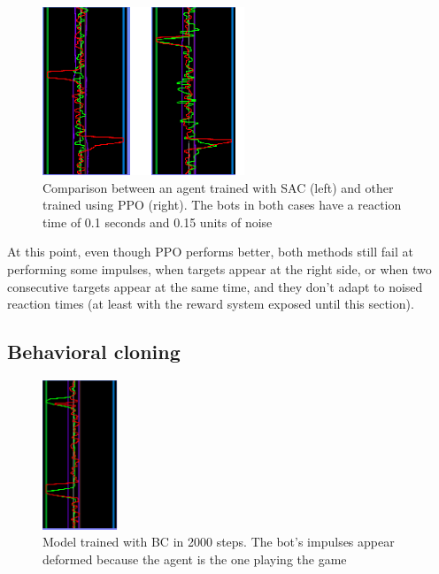 \begin{figure}[h]
  \centering
		\includegraphics[width=.6\textwidth]{img/rtSACvsPPO.png}
  \caption{Comparison between an agent trained with SAC (left) and other trained using PPO (right). The bots in both cases have a reaction time of 0.1 seconds and 0.15 units of noise}
  \label{fig:rtsacppo}
\end{figure}

At this point, even though PPO performs better, both methods still fail at performing some impulses, when targets appear at the right side, or when two consecutive targets appear at the same time, and they don't adapt to noised reaction times (at least with the reward system exposed until this section).

\subsection{Behavioral cloning}
\label{sec:timeBC}

\begin{figure}
    \centering
    \includegraphics[width=0.2\textwidth]{img/bcTNoise.png}
		\caption{Model trained with BC in 2000 steps. The bot's impulses appear deformed because the agent is the one playing the game}
		\label{fig:bcTNoise}
\end{figure}


